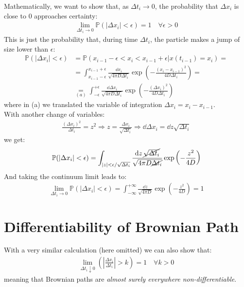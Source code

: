 \documentclass[../template.tex]{subfiles}
\begin{document}
Mathematically, we want to show that, as $\Delta t_i \to 0$, the probability that $\Delta x_i$ is close to $0$ approaches certainty:   
\begin{align*}
    \lim_{\Delta t_i \to 0} \mathbb{P}(|\Delta x_i| < \epsilon) = 1 \quad \forall \epsilon > 0
\end{align*}   
This is just the probability that, during time $\Delta t_i$, the particle makes a jump of size lower than $\epsilon$:
\begin{align*}
    \mathbb{P}(|\Delta x_i| < \epsilon) &= \mathbb{P}(x_{i-1} - \epsilon< x_{i} < x_{i-1}+\epsilon|x(t_{i-1}) = x_i) =\\
    &= \int_{x_{i-1}-\epsilon}^{x_{i-1}+\epsilon} \frac{\dd{x_i}}{\sqrt{4 \pi D \Delta t_i}} \exp\left(-\frac{(x_i - x_{i-1})^2}{4 D \Delta t_i} \right) =\\
    &\underset{(a)}{=}  \int_{-\epsilon}^{+\epsilon} \frac{\dd{\Delta x_i}}{\sqrt{4 \pi D \Delta t_i}} \exp\left(-\frac{(\Delta x_i)^2}{4 D \Delta t_i} \right)
\end{align*}
where in (a) we translated the variable of integration $\Delta x_i = x_{i}- x_{i-1}$.\\
With another change of variables:
\begin{align*}
    \frac{(\Delta x_i)^2}{\Delta t_i} = z^2 \Rightarrow z = \frac{\Delta x_i}{\sqrt{ \Delta t_i}} \Rightarrow \dd{\Delta x_i} = \dd{z} \sqrt{\Delta t_i}  
\end{align*}
we get:
\begin{align*}
    \mathbb{P}(|\Delta x_i| < \epsilon) = \int_{|z| < \epsilon/\sqrt{\Delta t_i }} \frac{\dd{z}\cancel{\sqrt{\Delta t_i}}}{\sqrt{4 \pi D \cancel{\Delta t_i}}}  \exp\left(-\frac{z^2}{4D} \right)
\end{align*}
And taking the continuum limit leads to:
\begin{align*}
    \lim_{\Delta t_i \to 0} \mathbb{P}(|\Delta x_i| < \epsilon) = \int_{-\infty}^{+\infty} \frac{\dd{z}}{\sqrt{4 \pi D}} \exp\left(-\frac{z^2}{4D} \right) =1
\end{align*}

 

\section{Differentiability of Brownian Path}
With a very similar calculation (here omitted) we can also show that:
\begin{align*}
    \lim_{\Delta t_i \downarrow 0} \left( \left|\frac{\Delta x_i}{\Delta t_i}\right| > k \right) = 1 \quad \forall k > 0
\end{align*}
meaning that Brownian paths are \textit{almost surely everywhere non-differentiable}.
\end{document}
